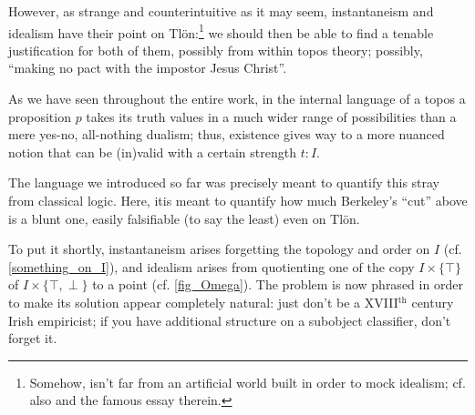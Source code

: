 However, as strange and counterintuitive as it may seem, instantaneism and idealism have their point on Tl\"on:\footnote{Somehow, \cite{tlonEN} isn't far from an artificial world built in order to mock idealism; cf. also \cite{borges1997otras} and the famous essay \cite{confutacion} therein.} we should then be able to find a tenable justification for both of them, possibly from within topos theory; possibly, ``making no pact with the impostor Jesus Christ''.

As we have seen throughout the entire work, in the internal language of a topos a proposition $p$ takes its truth values in a much wider range of possibilities than a mere yes-no, all-nothing dualism; thus, existence gives way to a more nuanced notion that can be (in)valid with a certain strength $t : I$. 

The language we introduced so far was precisely meant to quantify this stray from classical logic. Here, itis meant to quantify how much Berkeley's ``cut'' above is a blunt one, easily falsifiable (to say the least) even on Tl\"on. 

To put it shortly, instantaneism arises forgetting the topology and order on $I$ (cf. \autoref{something_on_I}), and idealism arises from quotienting one of the copy $I\times \{\top\}$ of $I\times \{\top,\perp\}$ to a point (cf. \autoref{fig_Omega}). The problem is now phrased in order to make its solution appear completely natural: just don't be a XVIII$^\text{th}$ century Irish empiricist; if you have additional structure on a subobject classifier, don't forget it.


